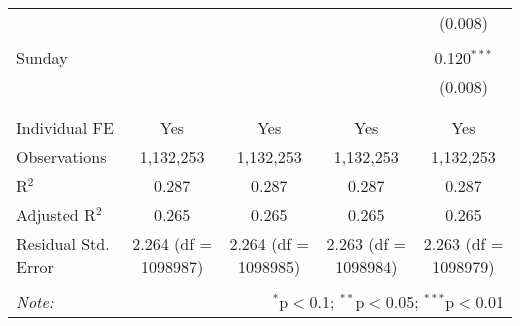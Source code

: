 \documentclass[
]{article}
\begin{document}
\begin{table}[!htbp]
{\begin{tabular}{@{\extracolsep{5pt}}lcccc}
  &  &  &  & (0.008) \\ 
  & & & & \\ 
 Sunday &  &  &  & 0.120$^{***}$ \\ 
  &  &  &  & (0.008) \\ 
  & & & & \\ 
\hline \\[-1.8ex] 
Individual FE & Yes & Yes & Yes & Yes \\ 
Observations & 1,132,253 & 1,132,253 & 1,132,253 & 1,132,253 \\ 
R$^{2}$ & 0.287 & 0.287 & 0.287 & 0.287 \\ 
Adjusted R$^{2}$ & 0.265 & 0.265 & 0.265 & 0.265 \\ 
Residual Std. Error & 2.264 (df = 1098987) & 2.264 (df = 1098985) & 2.263 (df = 1098984) & 2.263 (df = 1098979) \\ 
\hline 
\hline \\[-1.8ex] 
\textit{Note:}  & \multicolumn{4}{r}{$^{*}$p$<$0.1; $^{**}$p$<$0.05; $^{***}$p$<$0.01} \\ 
\end{tabular}
} 
\end{table} 
\newpage
\end{document}
